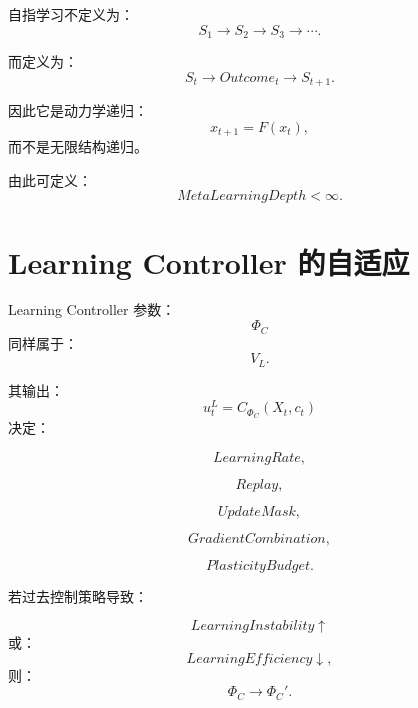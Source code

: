 自指学习不定义为：
\begin{equation}
S_1
\rightarrow
S_2
\rightarrow
S_3
\rightarrow
\cdots.
\end{equation}

而定义为：
\begin{equation}
\boxed{
S_t
\rightarrow
Outcome_t
\rightarrow
S_{t+1}.
}
\end{equation}

因此它是动力学递归：
\begin{equation}
x_{t+1}=F(x_t),
\end{equation}
而不是无限结构递归。

由此可定义：
\begin{equation}
\boxed{
MetaLearningDepth<\infty.
}
\end{equation}


\section{Learning Controller 的自适应}

Learning Controller 参数：
\begin{equation}
\Phi_C
\end{equation}
同样属于：
\begin{equation}
V_L.
\end{equation}

其输出：
\begin{equation}
u_t^L
=
C_{\Phi_C}(X_t,c_t)
\end{equation}
决定：

\begin{equation}
LearningRate,
\end{equation}

\begin{equation}
Replay,
\end{equation}

\begin{equation}
UpdateMask,
\end{equation}

\begin{equation}
GradientCombination,
\end{equation}

\begin{equation}
PlasticityBudget.
\end{equation}

若过去控制策略导致：

\begin{equation}
LearningInstability\uparrow
\end{equation}
或：
\begin{equation}
LearningEfficiency\downarrow,
\end{equation}
则：
\begin{equation}
\Phi_C
\rightarrow
\Phi_C'.
\end{equation}

